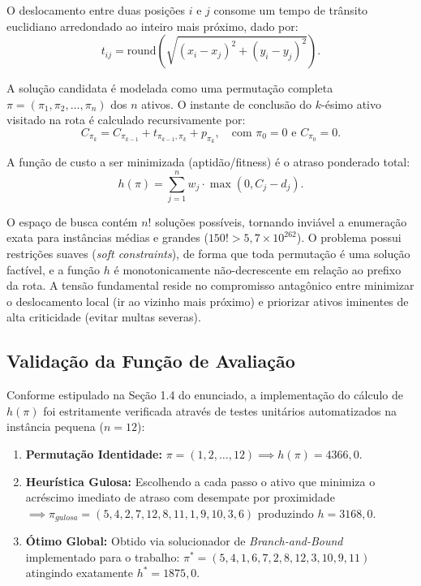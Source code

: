 \documentclass[11pt,a4paper]{article}
\begin{document}
O deslocamento entre duas posições $i$ e $j$ consome um tempo de trânsito euclidiano arredondado ao inteiro mais próximo, dado por:
\begin{equation}
    t_{ij} = \text{round}\left(\sqrt{(x_i - x_j)^2 + (y_i - y_j)^2}\right).
    \label{eq:distancia}
\end{equation}

A solução candidata é modelada como uma permutação completa $\pi = (\pi_1, \pi_2, \dots, \pi_n)$ dos $n$ ativos. O instante de conclusão do $k$-ésimo ativo visitado na rota é calculado recursivamente por:
\begin{equation}
    C_{\pi_k} = C_{\pi_{k-1}} + t_{\pi_{k-1}, \pi_k} + p_{\pi_k}, \quad \text{com } \pi_0 = 0 \text{ e } C_{\pi_0} = 0.
    \label{eq:conclusao}
\end{equation}

A função de custo a ser minimizada (aptidão/fitness) é o atraso ponderado total:
\begin{equation}
    h(\pi) = \sum_{j=1}^n w_j \cdot \max(0, C_j - d_j).
    \label{eq:fitness}
\end{equation}

O espaço de busca contém $n!$ soluções possíveis, tornando inviável a enumeração exata para instâncias médias e grandes ($150! > 5{,}7 \times 10^{262}$). O problema possui restrições suaves (\emph{soft constraints}), de forma que toda permutação é uma solução factível, e a função $h$ é monotonicamente não-decrescente em relação ao prefixo da rota. A tensão fundamental reside no compromisso antagônico entre minimizar o deslocamento local (ir ao vizinho mais próximo) e priorizar ativos iminentes de alta criticidade (evitar multas severas).

\subsection{Validação da Função de Avaliação}
Conforme estipulado na Seção 1.4 do enunciado, a implementação do cálculo de $h(\pi)$ foi estritamente verificada através de testes unitários automatizados na instância pequena ($n=12$):
\begin{enumerate}
    \item \textbf{Permutação Identidade:} $\pi = (1, 2, \dots, 12) \implies h(\pi) = 4366{,}0$.
    \item \textbf{Heurística Gulosa:} Escolhendo a cada passo o ativo que minimiza o acréscimo imediato de atraso com desempate por proximidade $\implies \pi_{gulosa} = (5, 4, 2, 7, 12, 8, 11, 1, 9, 10, 3, 6)$ produzindo $h = 3168{,}0$.
    \item \textbf{Ótimo Global:} Obtido via solucionador de \emph{Branch-and-Bound} implementado para o trabalho: $\pi^* = (5, 4, 1, 6, 7, 2, 8, 12, 3, 10, 9, 11)$ atingindo exatamente $h^* = 1875{,}0$.
\end{enumerate}
\end{document}
